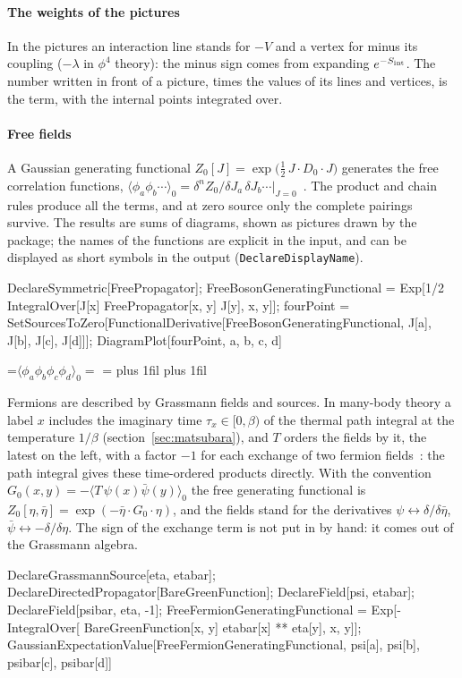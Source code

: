\documentclass[11pt,a4paper]{article}
\newcommand{\pkg}[1]{\texttt{#1}}
\newcommand{\inputfigure}[1]{\IfFileExists{figures/#1.tex}{}{\textcolor{red}{[missing: \detokenize{#1}]}}}
\newcommand{\diagramparagraph}{\rightskip=0pt plus 1fil \parfillskip=0pt plus 1fil
  \baselineskip=0pt \lineskiplimit=7pt \lineskip=7pt}
\newenvironment{diagramsum}[1]{%
  \par\nopagebreak\medskip\noindent
  \setbox0=\hbox{$\displaystyle #1 = {}$}%
  \hangindent=\wd0 \hangafter=1 \diagramparagraph
  \box0\ignorespaces}%
 {\par\vspace{9pt plus 3pt minus 2pt}}
\newcommand{\figuresum}[3][]{\begin{diagramsum}{#2}\inputfigure{#3}#1\end{diagramsum}}
\begin{document}
\paragraph{The weights of the pictures} In the pictures an interaction line stands for $-V$ and a vertex for minus its
coupling ($-\lambda$ in $\phi^4$ theory): the minus sign comes from expanding $e^{-S_{\rm int}}$. The number written in
front of a picture, times the values of its lines and vertices, is the term, with the internal points integrated over.

\paragraph{Free fields} A Gaussian generating functional $Z_0[J]=\exp\bigl(\tfrac12\,J\cdot D_0\cdot J\bigr)$ generates the free correlation
functions, $\langle\phi_a\phi_b\cdots\rangle_0=\delta^n Z_0/\delta J_a\,\delta J_b\cdots\bigr|_{J=0}$~\cite{Wick1950,NegeleOrland}. The product and
chain rules produce all the terms, and at zero source only the complete pairings survive. The results are sums of
diagrams, shown as pictures drawn by the package;
the names of the functions are explicit in the input, and can be displayed as short symbols in the output
(\pkg{DeclareDisplayName}).
\begin{code}
DeclareSymmetric[FreePropagator];
FreeBosonGeneratingFunctional = Exp[1/2 IntegralOver[J[x] FreePropagator[x, y] J[y],
    {x, y}]];
fourPoint = SetSourcesToZero[FunctionalDerivative[FreeBosonGeneratingFunctional,
    J[a], J[b], J[c], J[d]]];
DiagramPlot[fourPoint, {a, b, c, d}]
\end{code}
\figuresum{\langle\phi_a\phi_b\phi_c\phi_d\rangle_0}{pairings}
Fermions are described by Grassmann fields and sources. In many-body theory a label $x$ includes the imaginary time
$\tau_x\in[0,\beta)$ of the thermal path integral at the temperature $1/\beta$ (section~\ref{sec:matsubara}), and $T$
orders the fields by it, the latest on the left, with a factor $-1$ for each exchange of two fermion
fields~\cite{FetterWalecka,NegeleOrland}: the path integral gives these time-ordered products directly. With the
convention $G_0(x,y)=-\langle T\,\psi(x)\bar\psi(y)\rangle_0$ the free generating functional is
$Z_0[\eta,\bar\eta]=\exp(-\bar\eta\cdot G_0\cdot\eta)$, and the fields stand for the derivatives
$\psi\leftrightarrow\delta/\delta\bar\eta$, $\bar\psi\leftrightarrow-\delta/\delta\eta$. The sign of the exchange term is not
put in by hand: it comes out of the Grassmann algebra.
\begin{code}
DeclareGrassmannSource[eta, etabar]; DeclareDirectedPropagator[BareGreenFunction];
DeclareField[psi, etabar]; DeclareField[psibar, eta, -1];
FreeFermionGeneratingFunctional = Exp[-IntegralOver[
    BareGreenFunction[x, y] etabar[x] ** eta[y], {x, y}]];
GaussianExpectationValue[FreeFermionGeneratingFunctional,
    {psi[a], psi[b], psibar[c], psibar[d]}]
\end{code}
\end{document}
